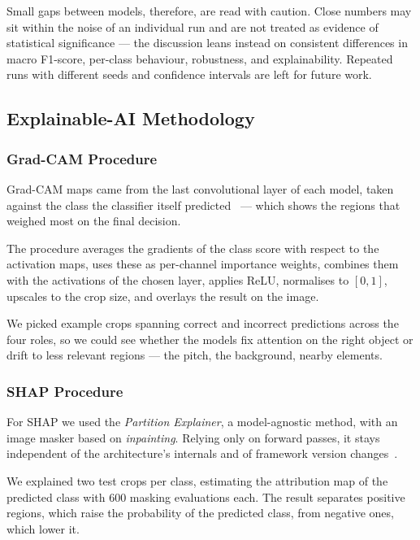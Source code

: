 \documentclass[preprint,12pt]{elsarticle}
\begin{document}
Small gaps between models, therefore, are read with caution. Close numbers may sit within the noise of an individual run and are not treated as evidence of statistical significance --- the discussion leans instead on consistent differences in macro F1-score, per-class behaviour, robustness, and explainability. Repeated runs with different seeds and confidence intervals are left for future work.

\subsection{Explainable-AI Methodology}

\subsubsection{Grad-CAM Procedure}

Grad-CAM maps came from the last convolutional layer of each model, taken against the class the classifier itself predicted~\cite{selvaraju2020gradcam} --- which shows the regions that weighed most on the final decision.

The procedure averages the gradients of the class score with respect to the activation maps, uses these as per-channel importance weights, combines them with the activations of the chosen layer, applies ReLU, normalises to $[0,1]$, upscales to the crop size, and overlays the result on the image.

We picked example crops spanning correct and incorrect predictions across the four roles, so we could see whether the models fix attention on the right object or drift to less relevant regions --- the pitch, the background, nearby elements.

\subsubsection{SHAP Procedure}

For SHAP we used the \textit{Partition Explainer}, a model-agnostic method, with an image masker based on \textit{inpainting}. Relying only on forward passes, it stays independent of the architecture's internals and of framework version changes~\cite{lundberg2017unified}.

We explained two test crops per class, estimating the attribution map of the predicted class with 600 masking evaluations each. The result separates positive regions, which raise the probability of the predicted class, from negative ones, which lower it.
\end{document}
